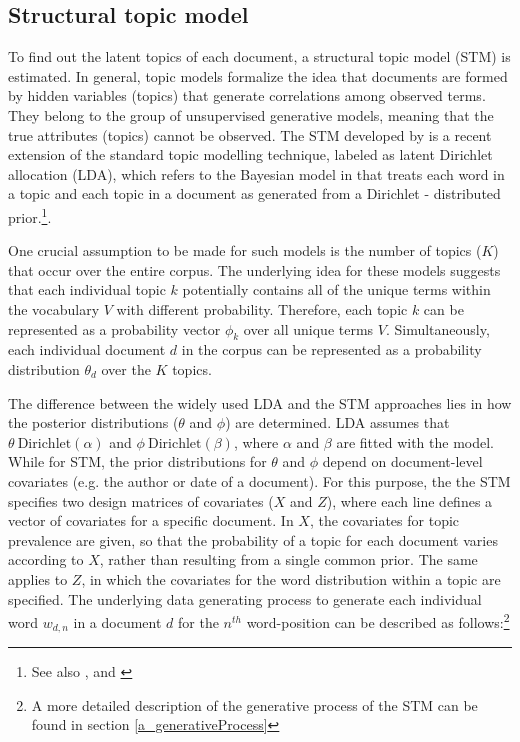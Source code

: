 \documentclass[12pt,a4paper,notitlepage]{article}
\begin{document}
\subsection{Structural topic model}\label{ch_stm}

To find out the latent topics of each document, a structural topic model (STM) is estimated. In general, topic models formalize the idea that documents are formed by hidden variables (topics) that generate correlations among observed terms. They belong to the group of unsupervised generative models, meaning that the true attributes (topics) cannot be observed. The STM developed by \citet{roberts_model_2016} is a recent extension of the standard topic modelling technique, labeled as latent Dirichlet allocation (LDA), which refers to the Bayesian model in \citet{blei_latent_2003} that treats each word in a topic and each topic in a document as generated from a Dirichlet - distributed prior.\footnote{See also \citet{griffiths_probabilistic_2002}, \citet{griffiths_finding_2004} and \citet{hofmann_probabilistic_1999}}. 

 One crucial assumption to be made for such models is the number of topics ($K$) that occur over the entire corpus. The underlying idea for these models suggests that each individual topic $k$ potentially contains all of the unique terms within the vocabulary $V$ with different probability. Therefore, each topic $k$ can be represented as a probability vector $\phi_k$ over all unique terms $V$. Simultaneously, each individual document $d$ in the corpus can be represented as a probability distribution $\theta_d$ over the $K$ topics.

The difference between the widely used LDA and the STM approaches lies in how the posterior distributions ($\theta$ and $\phi$) are determined. LDA assumes that $\theta ~ \text{Dirichlet}(\alpha)$ and $\phi ~ \text{Dirichlet}(\beta)$, where $\alpha$ and $\beta$ are fitted with the model. While for STM, the prior distributions for $\theta$ and $\phi$ depend on document-level covariates (e.g. the author or date of a document). For this purpose, the the STM specifies two design matrices of covariates ($X$ and $Z$), where each line defines a vector of covariates for a specific document. In $X$, the covariates for topic prevalence are given, so that the probability of a topic for each document varies according to $X$, rather than resulting from a single common prior. The same applies to $Z$, in which the covariates for the word distribution within a topic are specified. The underlying data generating process to generate each individual word $w_{d,n}$ in a document $d$ for the $n^{th}$ word-position can be described as follows:\footnote{A more detailed description of the generative process of the STM can be found in section \ref{a_generativeProcess}}
\end{document}
